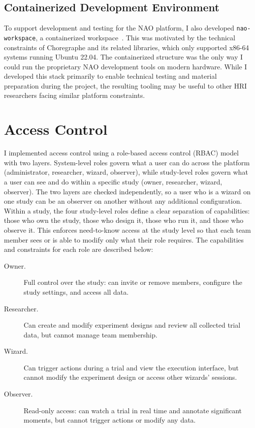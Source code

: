 \subsection{Containerized Development Environment}

To support development and testing for the NAO platform, I also developed \texttt{nao-workspace}, a containerized workspace~\cite{NaoWorkspaceRepo}. This was motivated by the technical constraints of Choregraphe and its related libraries, which only supported x86-64 systems running Ubuntu 22.04. The containerized structure was the only way I could run the proprietary NAO development tools on modern hardware. While I developed this stack primarily to enable technical testing and material preparation during the project, the resulting tooling may be useful to other HRI researchers facing similar platform constraints.

\section{Access Control}

I implemented access control using a role-based access control (RBAC) model with two layers. System-level roles govern what a user can do across the platform (administrator, researcher, wizard, observer), while study-level roles govern what a user can see and do within a specific study (owner, researcher, wizard, observer). The two layers are checked independently, so a user who is a wizard on one study can be an observer on another without any additional configuration. Within a study, the four study-level roles define a clear separation of capabilities: those who own the study, those who design it, those who run it, and those who observe it. This enforces need-to-know access at the study level so that each team member sees or is able to modify only what their role requires. The capabilities and constraints for each role are described below:

\begin{description}
    \item[Owner.] Full control over the study: can invite or remove members, configure the study settings, and access all data.
    \item[Researcher.] Can create and modify experiment designs and review all collected trial data, but cannot manage team membership.
    \item[Wizard.] Can trigger actions during a trial and view the execution interface, but cannot modify the experiment design or access other wizards' sessions.
    \item[Observer.] Read-only access: can watch a trial in real time and annotate significant moments, but cannot trigger actions or modify any data.
\end{description}

